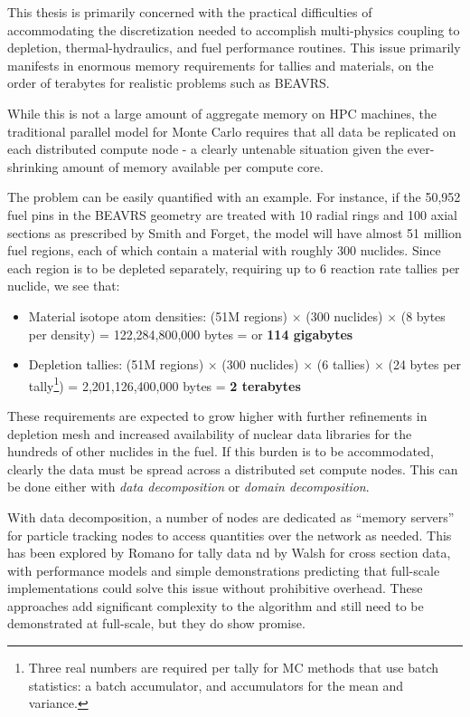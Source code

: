 \documentclass[12pt,twoside]{mitthesis-exec}
\begin{document}
This thesis is primarily concerned with the practical difficulties of
accommodating the discretization needed to accomplish multi-physics coupling to
depletion, thermal-hydraulics, and fuel performance routines. This issue
primarily manifests in enormous memory requirements for tallies and materials,
on the order of terabytes for realistic problems such as BEAVRS.

While this is not a large amount of aggregate memory on HPC machines, the
traditional parallel model for Monte Carlo requires that all data be replicated
on each distributed compute node - a clearly untenable situation given the
ever-shrinking amount of memory available per compute core.

The problem can be easily quantified with an example. For instance, if the
50,952 fuel pins in the BEAVRS geometry are treated with 10 radial rings and 100
axial sections as prescribed by Smith and Forget, the
model will have almost 51 million fuel regions, each of which contain a
material with roughly 300 nuclides. Since each region is to be depleted
separately, requiring up to 6 reaction rate tallies per nuclide, we see that:

\begin{itemize}
  \item Material isotope atom densities: (51M regions) $\times$ (300 nuclides)
  $\times$ (8 bytes per density) = 122,284,800,000 bytes = or \textbf{114
  gigabytes}
  \item Depletion tallies: (51M regions) $\times$ (300 nuclides) $\times$ (6
  tallies) $\times$ (24 bytes per tally\footnote{Three real numbers are required per tally for MC methods that use batch statistics: a batch accumulator, and accumulators for the mean and variance.}) = 2,201,126,400,000 bytes = \textbf{2
  terabytes}
\end{itemize}

These requirements are expected to grow higher with further refinements in
 depletion mesh and increased availability of nuclear data libraries for the
hundreds of other nuclides in the fuel. If this burden is to be accommodated,
clearly the data must be spread across a distributed set compute nodes. This can
be done either with \emph{data decomposition} or \emph{domain decomposition}.

With data decomposition, a number of nodes are dedicated as ``memory servers''
for particle tracking nodes to access quantities over the network as needed.
This has been explored by Romano for tally data nd by Walsh
\cite{walsh_ms_thesis} for cross section data, with performance models and
simple demonstrations predicting that full-scale implementations could solve
this issue without prohibitive overhead. These approaches add significant
complexity to the algorithm and still need to be demonstrated at full-scale, but
they do show promise.
\end{document}
